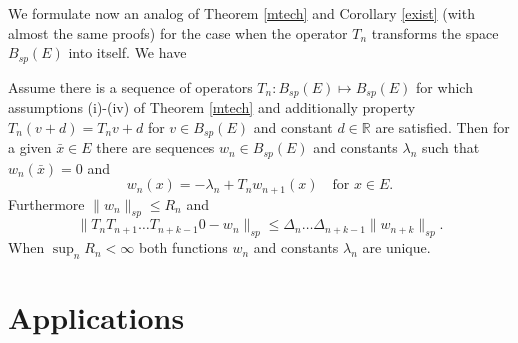 \documentclass[10pt,english]{extarticle}
\begin{document}
We formulate now an analog of Theorem \ref{mtech} and Corollary \ref{exist} (with almost the same proofs) for the case when the operator $T_n$ transforms the space $B_{sp}(E)$ into itself. We have
\begin{proposition}\label{mtechp}
Assume there is a sequence of operators $T_n:B_{sp}(E)\mapsto B_{sp}(E)$ for which assumptions (i)-(iv) of Theorem \ref{mtech} and additionally property $T_n(v+d)=T_nv+d$ for $v\in B_{sp}(E)$ and constant $d\in \mathbb{R}$ are satisfied. Then for a given $\bar{x}\in E$ there are sequences $w_n\in B_{sp}(E)$ and constants $\lambda_n$ such that $w_n(\bar{x})=0$ and
\begin{equation}\label{poissn}
w_n(x) = -\lambda_n + T_nw_{n+1}(x) \quad \mbox{for $x\in E$}.
\end{equation}
Furthermore $\|w_n\|_{sp}\leq R_n$ and
\begin{equation}\label{impinen}
\|T_nT_{n+1}\ldots T_{n+k-1}0-w_n\|_{sp}\leq  \Delta_n\ldots \Delta_{n+k-1}\|w_{n+k}\|_{sp}.
\end{equation}
When $\sup_n R_n <\infty$ both functions $w_n$ and constants $\lambda_n$ are unique.
\end{proposition}

\section{Applications}
\end{document}
